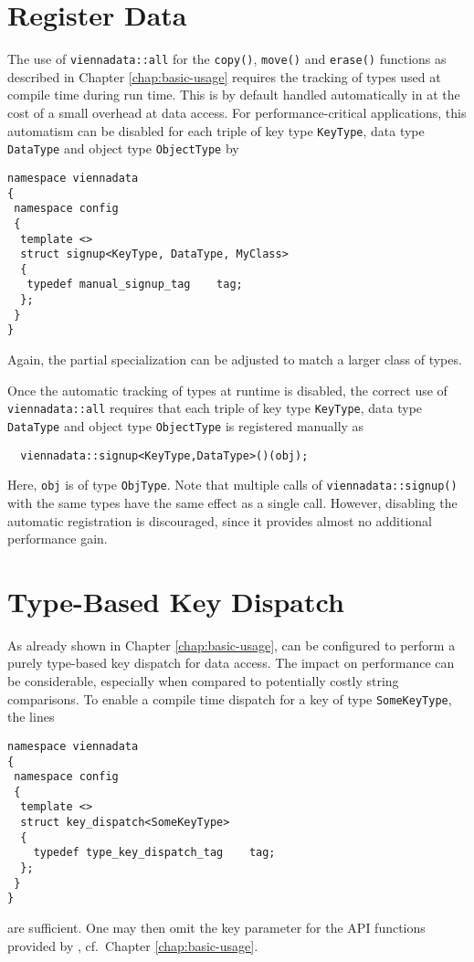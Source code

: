 
\section{Register Data} \label{sec:register-data}
The use of \lstinline|viennadata::all| for the \lstinline|copy()|, \lstinline|move()| and \lstinline|erase()| functions as described in Chapter \ref{chap:basic-usage}
requires the tracking of types used at compile time during run time. This is by default handled automatically in {\ViennaData} at the cost of a small overhead at data access.
For performance-critical applications, this automatism can be disabled for each triple of key type \lstinline|KeyType|, data type \lstinline|DataType| and object type \lstinline|ObjectType| by
\begin{lstlisting}
namespace viennadata
{
 namespace config
 {
  template <>
  struct signup<KeyType, DataType, MyClass>
  {
   typedef manual_signup_tag    tag;
  };
 }
}
\end{lstlisting}
Again, the partial specialization can be adjusted to match a larger class of types.

Once the automatic tracking of types at runtime is disabled, the correct use of \lstinline|viennadata::all| requires that each triple of key type \lstinline|KeyType|, data type \lstinline|DataType| and object type \lstinline|ObjectType| is registered manually as
\begin{lstlisting}
  viennadata::signup<KeyType,DataType>()(obj);
\end{lstlisting}
Here, \lstinline|obj| is of type \lstinline|ObjType|. Note that multiple calls of \lstinline|viennadata::signup()| with the same types have the same effect as a single call.
However, disabling the automatic registration is discouraged, since it provides almost no additional performance gain.

\section{Type-Based Key Dispatch} \label{sec:compiletime-keys}
As already shown in Chapter \ref{chap:basic-usage}, {\ViennaData} can be configured to perform a purely type-based key dispatch for data access.
The impact on performance can be considerable, especially when compared to potentially costly string comparisons.
To enable a compile time dispatch for a key of type \lstinline|SomeKeyType|, the lines
\begin{lstlisting}
namespace viennadata
{
 namespace config
 {
  template <>
  struct key_dispatch<SomeKeyType>
  {
    typedef type_key_dispatch_tag    tag;
  };
 }
} 
\end{lstlisting}
are sufficient. One may then omit the key parameter for the API functions provided by {\ViennaData}, cf.~Chapter \ref{chap:basic-usage}.

